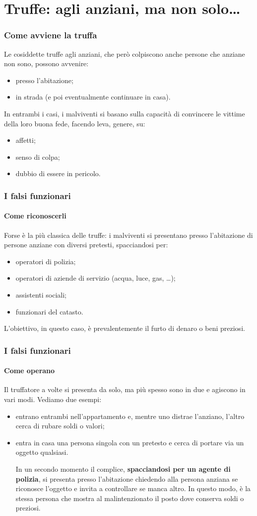 \documentclass[11pt]{beamer}
\begin{document}
	\section[Truffe]{Truffe: agli anziani, ma non solo\dots}
	\begin{frame}
		\frametitle{Come avviene la truffa}
		Le cosiddette truffe agli anziani, che però colpiscono anche persone che anziane non sono, possono avvenire:
		\begin{itemize}
			\item presso l'abitazione;
			\item in strada (e poi eventualmente continuare in casa).
		\end{itemize}
		In entrambi i casi, i malviventi si basano sulla capacità di convincere le vittime della loro buona fede, facendo leva, genere, su:
		\begin{itemize}
			\item affetti;
			\item senso di colpa;
			\item dubbio di essere in pericolo.
		\end{itemize} 
	\end{frame}	
	\begin{frame}
		\frametitle{I falsi funzionari}
		\framesubtitle{Come riconoscerli}
		
		Forse è la più classica delle truffe: i malviventi si presentano presso l'abitazione di persone anziane con diversi pretesti, spacciandosi per:
				
		\begin{itemize}
			\item operatori di polizia;
			\item operatori di aziende di servizio (acqua, luce, gas, \dots);
			\item assistenti sociali;
			\item funzionari del catasto.
		\end{itemize}
		L'obiettivo, in questo caso, è prevalentemente il furto di denaro o beni preziosi.
	\end{frame}
	
	\begin{frame}
		\frametitle{I falsi funzionari}
		\framesubtitle{Come operano}
		Il truffatore a volte si presenta da solo, ma più spesso sono in due e agiscono in vari modi. Vediamo due esempi:
		\begin{itemize}
			\item entrano entrambi nell'appartamento e, mentre uno distrae l'anziano, l'altro cerca di rubare soldi o valori;
			\item entra in casa una persona singola con un pretesto e cerca di portare via un oggetto qualsiasi. 
			
			In un secondo momento il complice, \textbf{spacciandosi per un agente di polizia}, si presenta presso l'abitazione chiedendo alla persona anziana se riconosce l'oggetto e invita a controllare se manca altro. In questo modo, è la stessa persona che mostra al malintenzionato il posto dove conserva soldi o preziosi.
			
		\end{itemize}
	\end{frame}
	
\end{document}
